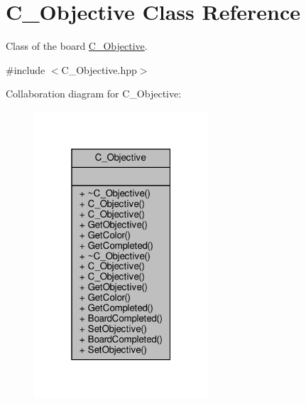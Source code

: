 \hypertarget{classC__Objective}{}\section{C\+\_\+\+Objective Class Reference}
\label{classC__Objective}


Class of the board \hyperlink{classC__Objective}{C\+\_\+\+Objective}.  




{\ttfamily \#include $<$C\+\_\+\+Objective.\+hpp$>$}



Collaboration diagram for C\+\_\+\+Objective\+:\nopagebreak
\begin{figure}[H]
\begin{center}
\leavevmode
\includegraphics[width=184pt]{classC__Objective__coll__graph}
\end{center}
\end{figure}
